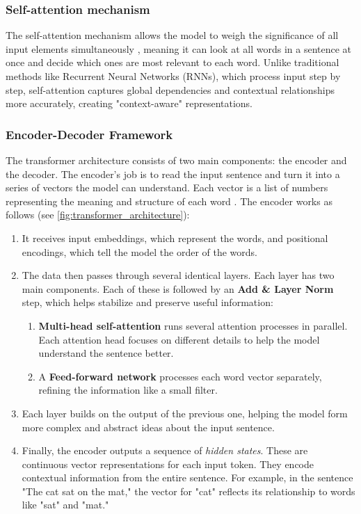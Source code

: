     \subsubsection{Self-attention mechanism}
    The self-attention mechanism allows the model to weigh the significance of all input elements simultaneously \parencite{xiaoIntroductionTransformersNLP2023}, meaning it can look at all words in a sentence at once and decide which ones are most relevant to each word. Unlike traditional methods like Recurrent Neural Networks (RNNs), which process input step by step, self-attention captures global dependencies and contextual relationships more accurately, creating "context-aware" representations.

    \subsubsection{Encoder-Decoder Framework} \label{subsection:encoder-decoder}
    The transformer architecture consists of two main components: the encoder and the decoder. The encoder’s job is to read the input sentence and turn it into a series of vectors the model can understand. Each vector is a list of numbers representing the meaning and structure of each word \parencite{xiaoIntroductionTransformersNLP2023}. The encoder works as follows (see \autoref{fig:transformer_architecture}):

    \begin{enumerate}
        \item It receives input embeddings, which represent the words, and positional encodings, which tell the model the order of the words.
        
        \item The data then passes through several identical layers. Each layer has two main components. Each of these is followed by an \textbf{Add \& Layer Norm} step, which helps stabilize and preserve useful information:
        \begin{enumerate}[label=\alph*.]
            \item \textbf{Multi-head self-attention} runs several attention processes in parallel. Each attention head focuses on different details to help the model understand the sentence better.
            \item A \textbf{Feed-forward network} processes each word vector separately, refining the information like a small filter.
    \end{enumerate}
    
    \item Each layer builds on the output of the previous one, helping the model form more complex and abstract ideas about the input sentence.
    
    \item Finally, the encoder outputs a sequence of \textit{hidden states}. These are continuous vector representations for each input token. They encode contextual information from the entire sentence. For example, in the sentence "The cat sat on the mat," the vector for "cat" reflects its relationship to words like "sat" and "mat."
\end{enumerate}

